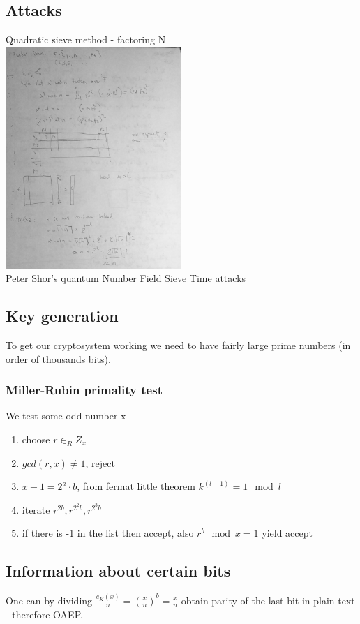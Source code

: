 \documentclass[a4paper,10pt]{article}
\begin{document}
\subsection*{Attacks}
Quadratic sieve method - factoring N\\
\includegraphics[width=0.5\textwidth]{rsa_attack.jpg}\\
Peter Shor's quantum
Number Field Sieve
Time attacks

\subsection*{Key generation}
To get our cryptosystem working we need to have fairly large prime numbers (in order of thousands bits). 
\subsubsection*{Miller-Rubin primality test}
We test some odd number x
\begin{enumerate}
\item choose $r \in_R Z_x$
\item $gcd(r,x) \neq 1$, reject
\item $x-1 = 2^a\cdot b$, from fermat little theorem $k^{(l-1)} = 1 \mod l$
\item iterate $r^{2b},r^{2^2b},r^{2^3b}$
\item if there is -1 in the list then accept, also $r^b \mod x = 1$ yield accept
\end{enumerate}

\subsection*{Information about certain bits}
One can by dividing $\frac{e_K(x)}{n} = \left(\frac{x}{n}\right)^b = \frac{x}{n}$ obtain parity of the last bit in plain text - therefore OAEP.
\end{document}
